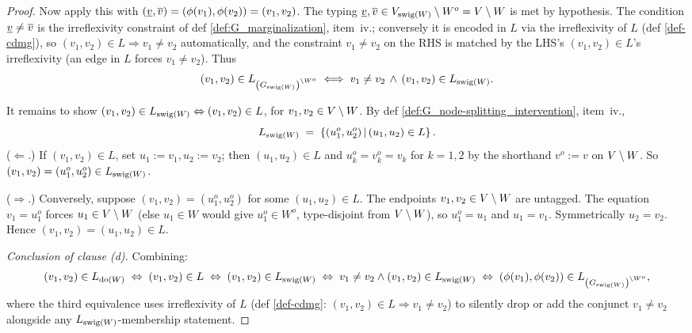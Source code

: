 \documentclass[main]{subfiles}
\begin{document}
\begin{proof}
Now apply this with $(\underline{v}, \overline{v}) = (\phi(v_1), \phi(v_2)) = (v_1, v_2)$. The typing $\underline{v}, \overline{v} \in V_{\mathrm{swig}(W)} \setminus W^o = V \setminus W$ is met by hypothesis. The condition $\underline{v} \neq \overline{v}$ is the irreflexivity constraint of def \ref{def:G_marginalization}, item~iv.; conversely it is encoded in $L$ via the irreflexivity of $L$ (def \ref{def-cdmg}), so $(v_1, v_2) \in L \Rightarrow v_1 \neq v_2$ automatically, and the constraint $v_1 \neq v_2$ on the RHS is matched by the LHS's $(v_1, v_2) \in L$'s irreflexivity (an edge in $L$ forces $v_1 \neq v_2$). Thus
\[
    (v_1, v_2) \in L_{\left ( G_{\mathrm{swig}(W)} \right )^{\setminus W^o}} \;\Longleftrightarrow\; v_1 \neq v_2 \,\wedge\, (v_1, v_2) \in L_{\mathrm{swig}(W)}.
\]

It remains to show $(v_1, v_2) \in L_{\mathrm{swig}(W)} \Leftrightarrow (v_1, v_2) \in L$, for $v_1, v_2 \in V \setminus W$. By def \ref{def:G_node-splitting_intervention}, item~iv.,
\[
    L_{\mathrm{swig}(W)} \;=\; \left \{ (u_1^o, u_2^o) \,\middle|\, (u_1, u_2) \in L \right \}.
\]
\smallskip\noindent($\Leftarrow$.) If $(v_1, v_2) \in L$, set $u_1 := v_1, u_2 := v_2$; then $(u_1, u_2) \in L$ and $u_k^o = v_k^o = v_k$ for $k = 1, 2$ by the shorthand $v^o := v$ on $V \setminus W$. So $(v_1, v_2) = (u_1^o, u_2^o) \in L_{\mathrm{swig}(W)}$.

\smallskip\noindent($\Rightarrow$.) Conversely, suppose $(v_1, v_2) = (u_1^o, u_2^o)$ for some $(u_1, u_2) \in L$. The endpoints $v_1, v_2 \in V \setminus W$ are untagged. The equation $v_1 = u_1^o$ forces $u_1 \in V \setminus W$ (else $u_1 \in W$ would give $u_1^o \in W^o$, type-disjoint from $V \setminus W$), so $u_1^o = u_1$ and $u_1 = v_1$. Symmetrically $u_2 = v_2$. Hence $(v_1, v_2) = (u_1, u_2) \in L$.

\smallskip\noindent\emph{Conclusion of clause (d).} Combining:
\[
    (v_1, v_2) \in L_{\operatorname{do}(W)}
        \;\Leftrightarrow\; (v_1, v_2) \in L
        \;\Leftrightarrow\; (v_1, v_2) \in L_{\mathrm{swig}(W)}
        \;\Leftrightarrow\; v_1 \neq v_2 \wedge (v_1, v_2) \in L_{\mathrm{swig}(W)}
        \;\Leftrightarrow\; (\phi(v_1), \phi(v_2)) \in L_{\left ( G_{\mathrm{swig}(W)} \right )^{\setminus W^o}},
\]
where the third equivalence uses irreflexivity of $L$ (def \ref{def-cdmg}: $(v_1, v_2) \in L \Rightarrow v_1 \neq v_2$) to silently drop or add the conjunct $v_1 \neq v_2$ alongside any $L_{\mathrm{swig}(W)}$-membership statement. \checkmark


\end{proof}
\end{document}
